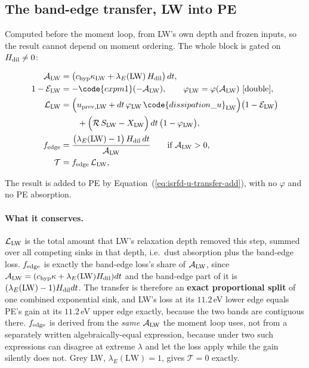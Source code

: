\subsection{The band-edge transfer, LW into PE}
\label{sec:isrf-eqdisc-transfer}

Computed before the moment loop, from LW's own depth and frozen inputs, so the
result cannot depend on moment ordering. The whole block is gated on
$H_{\rm dil} \ne 0$:

\begin{align}
  \mathcal{A}_{\rm LW} &= \big(c_{\rm hyp}\kappa_{\rm LW}
    + \lambda_E(\mathrm{LW})\, H_{\rm dil}\big)\, dt,
  \label{eq:isrfd-transfer-depth} \\
  1 - \mathcal{E}_{\rm LW} &= -\code{expm1}(-\mathcal{A}_{\rm LW}),
  \qquad
  \varphi_{\rm LW} = \varphi(\mathcal{A}_{\rm LW}) \ \text{[double]},
  \label{eq:isrfd-transfer-decay} \\
  \mathcal{L}_{\rm LW} &=
    \Big(u_{{\rm prev},{\rm LW}} + dt\,\varphi_{\rm LW}\,
      \code{dissipation\_u}_{\rm LW}\Big)\big(1 - \mathcal{E}_{\rm LW}\big)
    \nonumber\\
    &\qquad + \Big(\mathcal{R}\, S_{\rm LW} - X_{\rm LW}\Big)\,
      dt\,\big(1 - \varphi_{\rm LW}\big),
  \label{eq:isrfd-transfer-absorbed} \\
  f_{\rm edge} &= \frac{\big(\lambda_E(\mathrm{LW}) - 1\big)\, H_{\rm dil}\, dt}
    {\mathcal{A}_{\rm LW}}
    \qquad \text{if } \mathcal{A}_{\rm LW} > 0,
  \label{eq:isrfd-transfer-fedge} \\
  \mathcal{T} &= f_{\rm edge}\, \mathcal{L}_{\rm LW},
  \label{eq:isrfd-transfer}
\end{align}

The result is added to PE by
Equation~(\ref{eq:isrfd-u-transfer-add}), with no
$\varphi$ and no PE absorption.

\paragraph{What it conserves.} $\mathcal{L}_{\rm LW}$ is the total amount that
LW's relaxation depth removed this step, summed over all competing sinks in that
depth, i.e.\ dust absorption plus the band-edge loss. $f_{\rm edge}$ is exactly
the band-edge loss's share of $\mathcal{A}_{\rm LW}$, since
$\mathcal{A}_{\rm LW} = (c_{\rm hyp}\kappa + \lambda_E(\mathrm{LW})H_{\rm dil})dt$
and the band-edge part of it is
$(\lambda_E(\mathrm{LW}) - 1) H_{\rm dil} dt$. The transfer is therefore an
\textbf{exact proportional split} of one combined exponential sink, and LW's loss
at its $11.2$\,eV lower edge equals PE's gain at its $11.2$\,eV upper edge
exactly, because the two bands are contiguous there. $f_{\rm edge}$ is derived
from the
\emph{same} $\mathcal{A}_{\rm LW}$ the moment loop uses, not from a separately
written algebraically-equal expression, because under  two such
expressions can disagree at extreme $\lambda$ and let the loss apply while the
gain silently does not. Grey LW,
$\lambda_E(\mathrm{LW}) = 1$, gives $\mathcal{T} = 0$ exactly.

